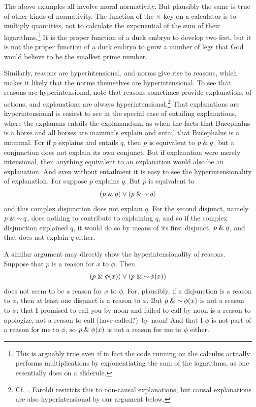 The above examples all involve moral normativity. But plausibly the same is true of other kinds of normativity. The function of the
$\times$ key on a calculator is to multiply quantities, not to calculate the exponential of the sum of their logarithms.\footnote{This is arguably
true even if in fact the code running on the calculus actually performs multiplications by exponentiating the sum of the logarithms,
as one essentially does on a sliderule.} It is 
the proper function of a duck embryo to develop two feet, but  it is not the proper function of a duck embryo to grow a
number of legs that God would believe to be the smallest prime number.

Similarly, reasons are hyperintensional, and norms give rise to reasons, which makes it likely that the norms themselves are
hyperintensional. To see that reasons are hyperintensional, note that reasons sometimes provide explanations of actions, and 
explanations are always hyperintensional.\footnote{Cf.\ . Faroldi restricts this to non-causal explanations, but
causal explanations are also hyperintensional by our argument below.}
 That explanations are hyperintensional is easiest to see in the special case of entailing
explanations, where the explanans entails the explanandum, as when the facts that Bucephalus is a horse and all 
horses are mammals explain
and entail that Bucephalus is a mammal. For if $p$ explains and entails $q$, then $p$ is equivalent to $p\mathrel{\&} q$, but a 
conjunction does not explain its own conjunct. But if explanation were merely intensional, then anything equivalent to an 
explanation would also be an explanation. And even without entailment it is easy to see the hyperintensionality of
explanation. For suppose $p$ explains $q$. But $p$ is equivalent to
$$
(p\mathrel{\&} q)\vee (p\mathrel{\&}\operatorname{\sim} q)
$$
and this complex disjunction does not explain $q$. 
For the second disjunct, namely $p\mathrel{\&}\operatorname{\sim} q$, does nothing to contribute to explaining $q$, and so if the complex disjunction 
explained $q$, it would do so by means of its first disjunct, $p\mathrel{\&} q$, and that does not explain $q$ either.

A similar argument may directly show the hyperintensionality of reasons. Suppose that $p$ is a reason for $x$ to $\phi$. Then 
$$(p\mathrel{\&} \phi(x))\vee (p\mathrel{\&} \operatorname{\sim}\phi(x))$$ does not seem to be a reason for $x$ to $\phi$. For, plausibly, if a disjunction is a 
reason to $\phi$, then at least one disjunct is a reason to $\phi$. But $p\mathrel{\&} \operatorname{\sim}\phi(x)$ is not a reason to $\phi$: that I
promised to call you by noon and failed to call by noon is a reason to apologize, not a reason to call (have called?)\ by noon! And that I $\phi$ is not 
part of a reason for me to $\phi$, so $p\mathrel{\&}\phi(x)$ is not a reason for me to $\phi$ either.

